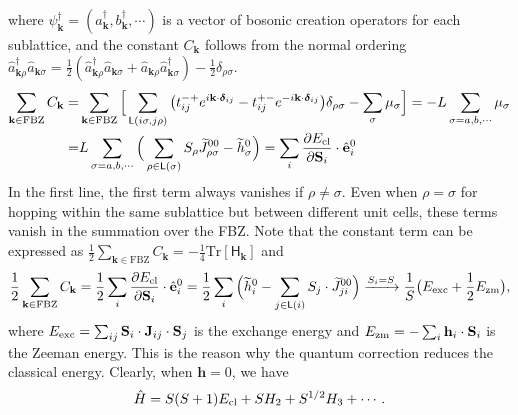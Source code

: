 \documentclass[aps, prx, nofootinbib, superscriptaddress]{revtex4-2}
\newcommand{\Tr}{\mathrm{Tr}}
\begin{document}
where $\psi^{\dagger}_{\mathbf{k}} = (a^{\dagger}_{\mathbf{k}}, b^{\dagger}_{\mathbf{k}}, \cdots)$ is a vector of bosonic creation operators for each sublattice, and the constant $C_{\mathbf{k}}$ follows from the normal ordering $\hat{a}_{\mathbf{k}\rho}^{\dagger} \hat{a}_{\mathbf{k}\sigma} = \frac{1}{2} (\hat{a}_{\mathbf{k}\rho}^{\dagger} \hat{a}_{ \mathbf{k}\sigma} + \hat{a}_{ \mathbf{k}\rho} \hat{a}_{\mathbf{k}\sigma}^{\dagger} ) - \frac{1}{2} \delta_{\rho\sigma}$.
\begin{align}
    \sum_{\mathbf{k} \in \mathrm{FBZ}} C_{\mathbf{k}} 
    = & \sum_{\mathbf{k} \in \mathrm{FBZ}} \Big[
    \sum_{\mathsf{L}(i\sigma,j\rho)} \big( t^{-+}_{ij} e^{i \mathbf{k} \cdot \bm{\delta}_{ij}} - t^{+-}_{ij} e^{-i \mathbf{k} \cdot \bm{\delta}_{ij}}\big) \delta_{\rho\sigma}    - \sum_{\sigma} \mu_{\sigma} \Big]
    = - L \sum_{\sigma = a, b, \cdots} \mu_{\sigma} \nonumber \\
    = & L \sum_{\sigma = a, b, \cdots} \Big( \sum_{\rho \in \mathsf{L}(\sigma)} S_{\rho} \widetilde{J}_{\rho\sigma}^{00} - \widetilde{h}_{\sigma}^{0} \Big) 
    = \sum_{i} \frac{\partial E_{\rm cl}}{\partial \mathbf{S}_{i}} \cdot \hat{\mathbf{e}}_{i}^{0} 
\end{align}
In the first line, the first term always vanishes if $\rho \neq \sigma$.
Even when $\rho = \sigma$ for hopping within the same sublattice but between different unit cells, these terms vanish in the summation over the FBZ.
Note that the constant term can be expressed as $\frac{1}{2} \sum_{\mathbf{k} \in \mathrm{FBZ}}  C_{\mathbf{k}}  = - \frac{1}{4} \Tr[\mathsf{H}_{\mathbf{k}}]$ and 
\begin{equation}
    \frac{1}{2} \sum_{\mathbf{k} \in \mathrm{FBZ}}  C_{\mathbf{k}} 
    = \frac{1}{2} \sum_{i} \frac{\partial E_{\rm cl}}{\partial \mathbf{S}_{i}} \cdot \hat{\mathbf{e}}_{i}^{0} 
    = \frac{1}{2} \sum_{i} \Big( \widetilde{h}_{i}^{0} - \sum_{j \in \mathsf{L}(i)} S_{j} \cdot \widetilde{J}_{ji}^{00} \Big)
    \xrightarrow{ S_{i} = S}  
    \frac{1}{S} \big( E_{\rm exc} + \frac{1}{2}  E_{\rm zm} \big),
\end{equation}
where $ E_{\rm exc} = \sum_{ij} \mathbf{S}_i \cdot \mathbf{J}_{ij} \cdot \mathbf{S}_j $ is the exchange energy and $ E_{\rm zm} = - \sum_{i} \mathbf{h}_{i} \cdot \mathbf{S}_{i}$ is the Zeeman energy. 
This is the reason why the quantum correction reduces the classical energy. 
Clearly, when $\mathbf{h} = 0$, we have
\begin{equation}
    \hat{H} = S(S+1) E_{\rm cl} + S H_{2} + S^{1/2} H_{3} + \cdots .
\end{equation}
\end{document}
